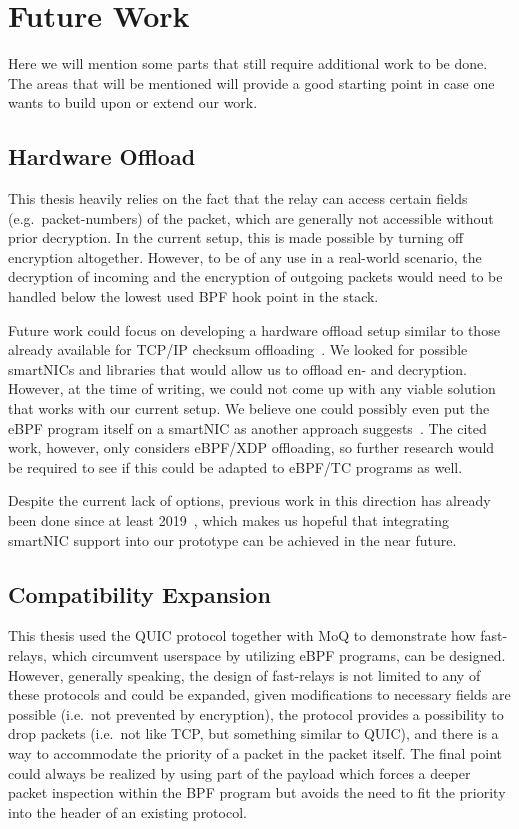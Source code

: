 \section{Future Work}\label{sec:future_work}

Here we will mention some parts that still require additional work 
to be done.
The areas that will be mentioned will provide a good starting point
in case one wants to build upon or extend our work.

\subsection{Hardware Offload}
This thesis heavily relies on the fact that the relay can
access certain fields (e.g.~packet-numbers) of the packet, 
which are generally not accessible without prior decryption.
In the current setup, this is made possible by turning off 
encryption altogether.
However, to be of any use in a real-world
scenario, the decryption of incoming and the encryption of
outgoing packets would need to be handled below the lowest 
used BPF hook point in the stack.

Future work could focus on developing a hardware offload 
setup similar to those already available for TCP/IP checksum 
offloading~\parencite{tcp-ip-offload-engine}.
We looked for possible smartNICs and libraries that would allow us
to offload en- and decryption.
However, at the time of writing, we could not come up with any viable solution
that works with our current setup. 
We believe one could possibly even put the eBPF program itself on a smartNIC as 
another approach suggests~\parencite{ebpf-offload-smartnics}.
The cited work, however, only considers eBPF/XDP offloading, so further 
research would be required to see if this could be adapted to eBPF/TC 
programs as well.

Despite the current lack of options, previous work in this direction has already been 
done since at least 2019~\parencite{quic-nic-offload}, which makes us hopeful that
integrating smartNIC support into our prototype can be achieved in the near future.

\subsection{Compatibility Expansion}\label{sec:compatibility_expansion}
This thesis used the QUIC protocol together with MoQ to demonstrate how fast-relays, 
which circumvent userspace by utilizing eBPF programs, can be designed.
However, generally speaking, the design of fast-relays is not limited to
any of these protocols and could be expanded, given modifications to 
necessary fields are possible (i.e.~not prevented by encryption),
the protocol provides a possibility to drop packets (i.e.~not like TCP, 
but something similar to QUIC),
and there is a way to accommodate the priority of a packet in the packet itself.
The final point could always be realized by using part of the payload
which forces a deeper packet inspection within the BPF program but 
avoids the need to fit the priority into the header of an existing 
protocol.

